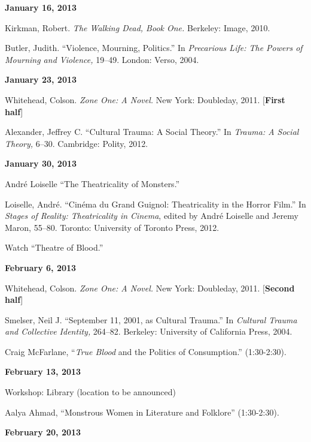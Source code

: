 \documentclass[12pt]{article}
\begin{document}
\textbf{January 16, 2013}

\begin{hangparas}{.5in}{1}
Kirkman, Robert. \textit{The Walking Dead, Book One.} Berkeley: Image, 2010.

Butler, Judith. ``Violence, Mourning, Politics.'' In \textit{Precarious Life: The Powers of Mourning and Violence,} 19--49. London: Verso, 2004.
\end{hangparas}

\textbf{January 23, 2013}

\begin{hangparas}{.5in}{1}
Whitehead, Colson. \textit{Zone One: A Novel.} New York: Doubleday, 2011. [\textbf{First half}]

Alexander, Jeffrey C. ``Cultural Trauma: A Social Theory.'' In \textit{Trauma: A Social Theory,} 6--30. Cambridge: Polity, 2012.
\end{hangparas}

\textbf{January 30, 2013}

\begin{hangparas}{.5in}{1}
Andr\'e Loiselle ``The Theatricality of Monsters.''

Loiselle, Andr\'e. ``Cin\'ema du Grand Guignol: Theatricality in the Horror Film.'' In \textit{Stages of Reality: Theatricality in Cinema}, edited by Andr\'e Loiselle and Jeremy Maron, 55--80. Toronto: University of Toronto Press, 2012.

Watch ``Theatre of Blood.''
\end{hangparas}

\textbf{February 6, 2013}

\begin{hangparas}{.5in}{1}
Whitehead, Colson. \textit{Zone One: A Novel.} New York: Doubleday, 2011. [\textbf{Second half}]

Smelser, Neil J. ``September 11, 2001, as Cultural Trauma.'' In \textit{Cultural Trauma and Collective Identity,} 264--82. Berkeley: University of California Press, 2004.

Craig McFarlane, ``\textit{True Blood} and the Politics of Consumption.'' (1:30-2:30).
\end{hangparas}

\textbf{February 13, 2013}

Workshop: Library (location to be announced)

Aalya Ahmad, ``Monstrous Women in Literature and Folklore'' (1:30-2:30).

\textbf{February 20, 2013}
\end{document}
